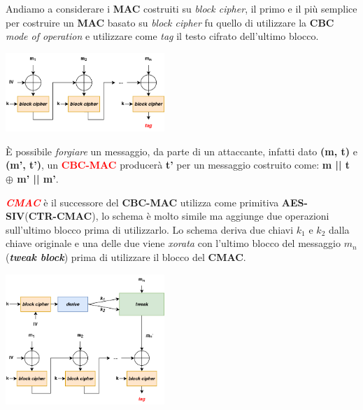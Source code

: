 \begin{flushleft}
    Andiamo a considerare i \textbf{MAC} costruiti su \textit{block cipher}, il primo e il più semplice per costruire un \textbf{MAC} basato su \textit{block cipher} fu quello di utilizzare la \textbf{CBC} \textit{mode of operation} e utilizzare come \textit{tag} il testo cifrato dell'ultimo blocco.

    {\centering
        \includegraphics[width=0.45\textwidth]{img/cbc_mac.png}
    \par}

    È possibile \textit{forgiare} un messaggio, da parte di un attaccante, infatti dato \textbf{(m, t)} e \textbf{(m', t')}, un \textcolor{red}{\textbf{CBC-MAC}} producerà \textbf{t'} per un messaggio costruito come: \textbf{m || t $\oplus$ m' || m'}.

    \medskip
    
    \textcolor{red}{\textbf{\textit{CMAC}}} è il successore del \textbf{CBC-MAC} utilizza come primitiva \textbf{AES-SIV}(\textbf{CTR-CMAC}), lo schema è molto simile ma aggiunge due operazioni sull'ultimo blocco prima di utilizzarlo. Lo schema deriva due chiavi $k_1$ e $k_2$ dalla chiave originale e una delle due viene \textit{xorata} con l'ultimo blocco del messaggio $m_n$ (\textbf{\textit{tweak block}}) prima di utilizzare il blocco del \textbf{CMAC}.

    {\centering
        \includegraphics[width=0.45\textwidth]{img/cmac.png}
    \par}

    \newpage


\end{flushleft}
